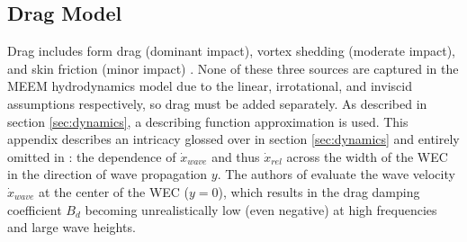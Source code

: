 


\clearpage
\subsection{Drag Model\label{sec:appendix-drag}}
Drag includes form drag (dominant impact), vortex shedding (moderate impact), and skin friction (minor impact) \cite{quartier_influence_2021}.
None of these three sources are captured in the MEEM hydrodynamics model due to the linear, irrotational, and inviscid assumptions respectively, so drag must be added separately.
As described in section \ref{sec:dynamics}, a describing function approximation is used.
This appendix describes an intricacy glossed over in section \ref{sec:dynamics} and entirely omitted in \cite{quartier_influence_2021}: the dependence of $\dot{x}_{wave}$ and thus $\dot{x}_{rel}$ across the width of the WEC in the direction of wave propagation $y$.
The authors of \cite{quartier_influence_2021} evaluate the wave velocity $\dot{x}_{wave}$ at the center of the WEC ($y=0$), which results in the drag damping coefficient $B_d$ becoming unrealistically low (even negative) at high frequencies and large wave heights.

